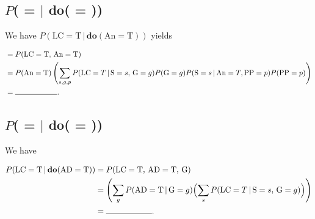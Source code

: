\documentclass{article}
\begin{document}
\subsection{$P$( =  $\vert$ \textbf{do}( = ))}

We have $P(\text{LC} = \text{T} \,\vert\, \textbf{do}(\text{An} = \text{T}))$ yields

\begin{align*}
     &= P(\text{LC} = \text{T},\, \text{An} = \text{T}) \\
        &= P(\text{An} = \text{T})\left(\sum_{s, g, p}P(\text{LC} = T \,|\, \text{S} = s,\, \text{G} = g)P(\text{G} = g)P(\text{S}=s\,|\, \text{An} = T, \text{PP} = p)P(\text{PP} = p)\right) \\
    &= \rule{2cm}{0.15mm}.
\end{align*}

\subsection{$P$( =  $\vert$ \textbf{do}( = ))}

We have

\begin{align*}
    P(\text{LC} = \text{T} \,\vert\, \textbf{do}(\text{AD} = \text{T})) &= P(\text{LC} = \text{T},\, \text{AD} = \text{T},\, \text{G}) \\
        &= \Biggl( \sum_{g} P(\text{AD} = \text{T}\,\vert\, \text{G} = g)\Bigl(\sum_{s}P(\text{LC} = T \,|\, \text{S} = s,\, \text{G} = g)\Bigr)\Biggr) \\
    &= \rule{2cm}{0.15mm}.
\end{align*}
\end{document}
